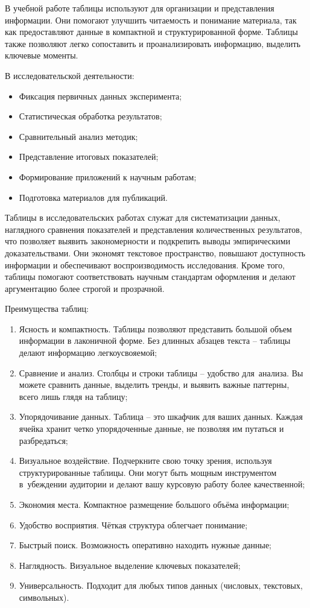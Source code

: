 \documentclass{ou}
\begin{document}
В учебной работе таблицы используют для организации и представления информации. Они помогают улучшить читаемость и понимание материала, так как предоставляют данные в компактной и структурированной форме. Таблицы также позволяют легко сопоставить и проанализировать информацию, выделить ключевые моменты.

В исследовательской деятельности:
\begin{itemize}[label=-, leftmargin=0em, itemindent=3.35em, nosep]
\item Фиксация первичных данных эксперимента;
\item Статистическая обработка результатов;
\item Сравнительный анализ методик;
\item Представление итоговых показателей;
\item Формирование приложений к научным работам;
\item Подготовка материалов для публикаций.
\end{itemize}

Таблицы в исследовательских работах служат для систематизации данных, наглядного сравнения показателей и представления количественных результатов, что позволяет выявить закономерности и подкрепить выводы эмпирическими доказательствами. Они экономят текстовое пространство, повышают доступность информации и обеспечивают воспроизводимость исследования. Кроме того, таблицы помогают соответствовать научным стандартам оформления и делают аргументацию более строгой и прозрачной.

Преимущества таблиц:
\begin{enumerate}[leftmargin=0em, itemindent=3.75em, nosep, label=\arabic*)]
\item Ясность и компактность. Таблицы позволяют представить большой объем информации в лаконичной форме. Без длинных абзацев текста -- таблицы делают информацию легкоусвояемой;
\item Сравнение и анализ. Столбцы и строки таблицы -- удобство для~анализа. Вы можете сравнить данные, выделить тренды, и выявить важные паттерны, всего лишь глядя на таблицу;
\item Упорядочивание данных. Таблица -- это шкафчик для ваших данных. Каждая ячейка хранит четко упорядоченные данные, не позволяя им путаться и разбредаться;
\item Визуальное воздействие. Подчеркните свою точку зрения, используя структурированные таблицы. Они могут быть мощным инструментом в~убеждении аудитории и делают вашу курсовую работу более качественной;
\item Экономия места. Компактное размещение большого объёма информации;
\item Удобство восприятия. Чёткая структура облегчает понимание;
\item Быстрый поиск. Возможность оперативно находить нужные данные;
\item Наглядность. Визуальное выделение ключевых показателей;
\item Универсальность. Подходит для любых типов данных (числовых, текстовых, символьных).
\end{enumerate}
\end{document}
